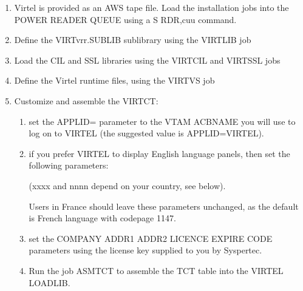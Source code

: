 \documentclass[letterpaper,10pt,english]{sphinxmanual}
\begin{document}
\label{\detokenize{Getting_Started:z-vse}}\begin{enumerate}
\def\theenumi{\arabic{enumi}}
\def\labelenumi{\theenumi .}
\makeatletter\def\p@enumii{\p@enumi \theenumi .}\makeatother
\item {} 
Virtel is provided as an AWS tape file. Load the installation jobs into the POWER READER QUEUE using a S RDR,cuu command.

\item {} 
Define the VIRTvrr.SUBLIB sublibrary using the VIRTLIB job

\item {} 
Load the CIL and SSL libraries using the VIRTCIL and VIRTSSL jobs

\item {} 
Define the Virtel runtime files, using the VIRTVS job

\item {} 
Customize and assemble the VIRTCT:
\begin{enumerate}
\def\theenumii{\alph{enumii}}
\def\labelenumii{(\theenumii )}
\makeatletter\def\p@enumiii{\p@enumii (\theenumii )}\makeatother
\item {} 
set the APPLID= parameter to the VTAM ACBNAME you will use to log on to VIRTEL (the suggested value is APPLID=VIRTEL).

\item {} 
if you prefer VIRTEL to display English language panels, then set the following parameters:

\begin{sphinxVerbatim}[commandchars=\\\{\}]
                                               
                                           
                                        
\end{sphinxVerbatim}

(xxxx and nnnn depend on your country, see below).

Users in France should leave these parameters unchanged, as the default is French language with codepage 1147.

\item {} 
set the COMPANY ADDR1 ADDR2 LICENCE EXPIRE CODE parameters using the license key supplied to you by Syspertec.

\item {} 
Run the job ASMTCT  to assemble the TCT table into the VIRTEL LOADLIB.


\end{enumerate}
\end{enumerate}
\end{document}
